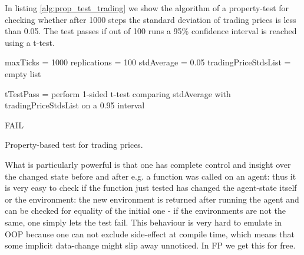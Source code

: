 
In listing \ref{alg:prop_test_trading} we show the algorithm of a property-test for checking whether after 1000 steps the standard deviation of trading prices is less than 0.05. The test passes if out of 100 runs a 95\% confidence interval is reached using a t-test.

\begin{algorithm}
maxTicks = 1000\;
replications = 100\;
stdAverage = 0.05\;
tradingPriceStdsList = empty list\;


tTestPass = perform 1-sided t-test comparing stdAverage with tradingPriceStdsList on a 0.95 interval\;

 {
  FAIL\;
}
\caption{Property-based test for trading prices.}
\end{algorithm}
\label{alg:prop_test_trading}

What is particularly powerful is that one has complete control and insight over the changed state before and after e.g. a function was called on an agent: thus it is very easy to check if the function just tested has changed the agent-state itself or the environment: the new environment is returned after running the agent and can be checked for equality of the initial one - if the environments are not the same, one simply lets the test fail. This behaviour is very hard to emulate in OOP because one can not exclude side-effect at compile time, which means that some implicit data-change might slip away unnoticed. In FP we get this for free.
